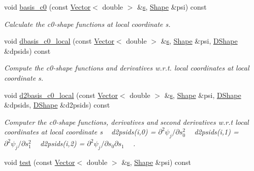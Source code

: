 \begin{DoxyCompactItemize}
void \hyperlink{classoomph_1_1C1CurvedElement_3_012_00_01NNODE__1D_01_4_a88435c4bcf40bbe214598d76c88b49fc}{basis\+\_\+c0} (const \hyperlink{classoomph_1_1Vector}{Vector}$<$ double $>$ \&\hyperlink{cfortran_8h_ab7123126e4885ef647dd9c6e3807a21c}{s}, \hyperlink{classoomph_1_1Shape}{Shape} \&psi) const
\begin{DoxyCompactList}\small\item\em Calculate the c0-\/shape functions at local coordinate s. \end{DoxyCompactList}\item 
void \hyperlink{classoomph_1_1C1CurvedElement_3_012_00_01NNODE__1D_01_4_a51fd0d8ec09057548696aa99562b9f5a}{dbasis\+\_\+c0\+\_\+local} (const \hyperlink{classoomph_1_1Vector}{Vector}$<$ double $>$ \&\hyperlink{cfortran_8h_ab7123126e4885ef647dd9c6e3807a21c}{s}, \hyperlink{classoomph_1_1Shape}{Shape} \&psi, \hyperlink{classoomph_1_1DShape}{D\+Shape} \&dpsids) const
\begin{DoxyCompactList}\small\item\em Compute the c0-\/shape functions and derivatives w.\+r.\+t. local coordinates at local coordinate s. \end{DoxyCompactList}\item 
void \hyperlink{classoomph_1_1C1CurvedElement_3_012_00_01NNODE__1D_01_4_a878207a94d904e0d954a45de2a626a0e}{d2basis\+\_\+c0\+\_\+local} (const \hyperlink{classoomph_1_1Vector}{Vector}$<$ double $>$ \&\hyperlink{cfortran_8h_ab7123126e4885ef647dd9c6e3807a21c}{s}, \hyperlink{classoomph_1_1Shape}{Shape} \&psi, \hyperlink{classoomph_1_1DShape}{D\+Shape} \&dpsids, \hyperlink{classoomph_1_1DShape}{D\+Shape} \&d2psids) const
\begin{DoxyCompactList}\small\item\em Computer the c0-\/shape functions, derivatives and second derivatives w.\+r.\+t local coordinates at local coordinate s ~\newline
d2psids(i,0) = $ \partial^2 \psi_j / \partial s_0^2 $ ~\newline
d2psids(i,1) = $ \partial^2 \psi_j / \partial s_1^2 $ ~\newline
d2psids(i,2) = $ \partial^2 \psi_j / \partial s_0 \partial s_1 $ ~\newline
. \end{DoxyCompactList}\item 
void \hyperlink{classoomph_1_1C1CurvedElement_3_012_00_01NNODE__1D_01_4_ae6c5bb18e4448678ba6f8d52fe146181}{test} (const \hyperlink{classoomph_1_1Vector}{Vector}$<$ double $>$ \&\hyperlink{cfortran_8h_ab7123126e4885ef647dd9c6e3807a21c}{s}, \hyperlink{classoomph_1_1Shape}{Shape} \&psi) const

\end{DoxyCompactItemize}
